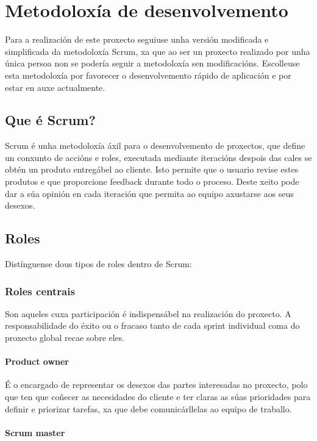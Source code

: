 \chapter{Metodoloxía de desenvolvemento}

Para a realización de este proxecto seguiuse unha versión modificada e simplificada da metodoloxía Scrum, xa que ao ser un proxecto realizado por unha única persoa non se podería seguir a metodoloxía sen modificacións. Escolleuse esta metodoloxía por favorecer o desenvolvemento rápido de aplicación e por estar en auxe actualmente.

\section{Que é Scrum?}

Scrum \cite{scrum} é unha metodoloxía áxil para o desenvolvemento de proxectos, que define un conxunto de accións e roles, executada mediante iteracións despois das cales se obtén un produto entregábel ao cliente. Isto permite que o usuario revise estes produtos e que proporcione feedback durante todo o proceso. Deste xeito pode dar a súa opinión en cada iteración que permita ao equipo axustarse aos seus desexos.

\section{Roles}

Distínguense dous tipos de roles dentro de Scrum:

\subsection{Roles centrais}

Son aqueles cuxa participación é indispensábel na realización do proxecto. A responsabilidade do éxito ou o fracaso tanto de cada sprint individual coma do proxecto global recae sobre eles.

\subsubsection{Product owner}

É o encargado de representar os desexos das partes interesadas no proxecto, polo que ten que coñecer as necesidades do cliente e ter claras as súas prioridades para definir e priorizar tarefas, xa que debe comunicárllelas ao equipo de traballo.

\subsubsection{Scrum master}

